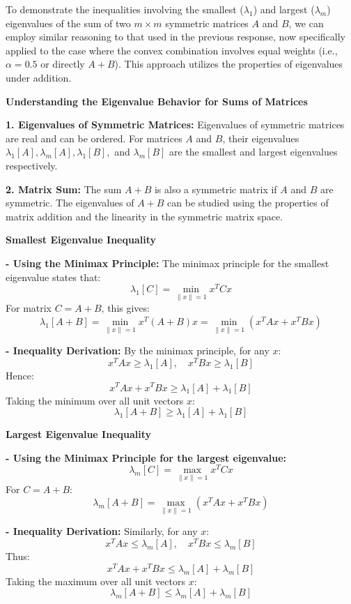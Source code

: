 \documentclass[8pt]{article}
\begin{document}
{To demonstrate the inequalities involving the smallest (\(\lambda_1\)) and largest (\(\lambda_m\)) eigenvalues of the sum of two \(m \times m\) symmetric matrices \(A\) and \(B\), we can employ similar reasoning to that used in the previous response, now specifically applied to the case where the convex combination involves equal weights (i.e., \(\alpha = 0.5\) or directly \(A + B\)). This approach utilizes the properties of eigenvalues under addition.

\textbf{Understanding the Eigenvalue Behavior for Sums of Matrices}

\textbf{1. Eigenvalues of Symmetric Matrices:}
   Eigenvalues of symmetric matrices are real and can be ordered. For matrices \(A\) and \(B\), their eigenvalues \(\lambda_1[A], \lambda_m[A], \lambda_1[B],\) and \(\lambda_m[B]\) are the smallest and largest eigenvalues respectively.

\textbf{2. Matrix Sum:}
   The sum \(A + B\) is also a symmetric matrix if \(A\) and \(B\) are symmetric. The eigenvalues of \(A + B\) can be studied using the properties of matrix addition and the linearity in the symmetric matrix space.

\textbf{Smallest Eigenvalue Inequality}

\textbf{- Using the Minimax Principle:}
   The minimax principle for the smallest eigenvalue states that:
   \[
   \lambda_1[C] = \min_{\|x\| = 1} x^T C x
   \]
   For matrix \(C = A + B\), this gives:
   \[
   \lambda_1[A+B] = \min_{\|x\| = 1} x^T (A+B) x = \min_{\|x\| = 1} (x^T A x + x^T B x)
   \]

\textbf{- Inequality Derivation:}
   By the minimax principle, for any \(x\):
   \[
   x^T A x \geq \lambda_1[A], \quad x^T B x \geq \lambda_1[B]
   \]
   Hence:
   \[
   x^T A x + x^T B x \geq \lambda_1[A] + \lambda_1[B]
   \]
   Taking the minimum over all unit vectors \(x\):
   \[
   \lambda_1[A + B] \geq \lambda_1[A] + \lambda_1[B]
   \]

\textbf{Largest Eigenvalue Inequality}

\textbf{- Using the Minimax Principle for the largest eigenvalue:}
   \[
   \lambda_m[C] = \max_{\|x\| = 1} x^T C x
   \]
   For \(C = A + B\):
   \[
   \lambda_m[A+B] = \max_{\|x\| = 1} (x^T A x + x^T B x)
   \]

\textbf{- Inequality Derivation:}
   Similarly, for any \(x\):
   \[
   x^T A x \leq \lambda_m[A], \quad x^T B x \leq \lambda_m[B]
   \]
   Thus:
   \[
   x^T A x + x^T B x \leq \lambda_m[A] + \lambda_m[B]
   \]
   Taking the maximum over all unit vectors \(x\):
   \[
   \lambda_m[A + B] \leq \lambda_m[A] + \lambda_m[B]
   \]


}
\end{document}
